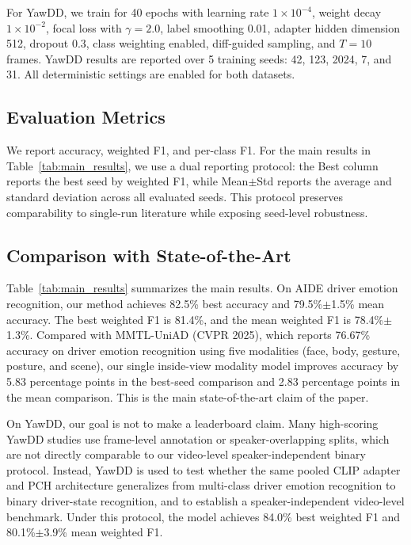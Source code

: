 For YawDD, we train for 40 epochs with learning rate $1\times10^{-4}$, weight decay $1\times10^{-2}$, focal loss with $\gamma=2.0$, label smoothing 0.01, adapter hidden dimension 512, dropout 0.3, class weighting enabled, diff-guided sampling, and $T=10$ frames. YawDD results are reported over 5 training seeds: 42, 123, 2024, 7, and 31. All deterministic settings are enabled for both datasets.

\subsection{Evaluation Metrics}
\label{sec:evaluation_metrics}

We report accuracy, weighted F1, and per-class F1. For the main results in Table~\ref{tab:main_results}, we use a dual reporting protocol: the Best column reports the best seed by weighted F1, while Mean$\pm$Std reports the average and standard deviation across all evaluated seeds. This protocol preserves comparability to single-run literature while exposing seed-level robustness.

\subsection{Comparison with State-of-the-Art}
\label{sec:sota_comparison}

Table~\ref{tab:main_results} summarizes the main results. On AIDE driver emotion recognition, our method achieves 82.5\% best accuracy and 79.5\%$\pm$1.5\% mean accuracy. The best weighted F1 is 81.4\%, and the mean weighted F1 is 78.4\%$\pm$1.3\%. Compared with MMTL-UniAD (CVPR 2025), which reports 76.67\% accuracy on driver emotion recognition using five modalities (face, body, gesture, posture, and scene), our single inside-view modality model improves accuracy by 5.83 percentage points in the best-seed comparison and 2.83 percentage points in the mean comparison. This is the main state-of-the-art claim of the paper.

On YawDD, our goal is not to make a leaderboard claim. Many high-scoring YawDD studies use frame-level annotation or speaker-overlapping splits, which are not directly comparable to our video-level speaker-independent binary protocol. Instead, YawDD is used to test whether the same pooled CLIP adapter and PCH architecture generalizes from multi-class driver emotion recognition to binary driver-state recognition, and to establish a speaker-independent video-level benchmark. Under this protocol, the model achieves 84.0\% best weighted F1 and 80.1\%$\pm$3.9\% mean weighted F1.

